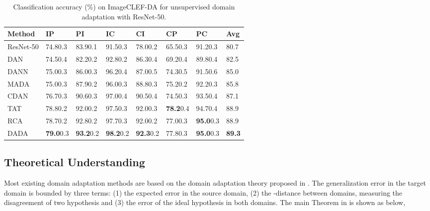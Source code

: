 \documentclass{ecai}
\begin{document}
\begin{table*}[!htbp]
\centering
\caption{Classification accuracy (\%) on ImageCLEF-DA for unsupervised domain adaptation with ResNet-50.}
\begin{tabular}{p{3.0cm}p{1.4cm}<{\centering}p{1.4cm}<{\centering}p{1.4cm}<{\centering}p{1.4cm}<{\centering}p{1.4cm}<{\centering}p{1.4cm}<{\centering}p{1.4cm}<{\centering}}
\toprule
Method&   IP&   PI&   IC&   CI&   CP&   PC&  Avg\\
\midrule
ResNet-50\cite{b36}&  74.80.3&   83.90.1&   91.50.3&   78.00.2&   65.50.3&   91.20.3&   80.7\\
DAN\cite{b9}&  74.50.4&   82.20.2&   92.80.2&   86.30.4&   69.20.4&   89.80.4&   82.5\\
DANN\cite{b18}& 75.00.3&   86.00.3&   96.20.4&   87.00.5&   74.30.5&   91.50.6&   85.0\\
MADA\cite{b13}& 75.00.3&   87.90.2&   96.00.3&   88.80.3&   75.20.2&   92.20.3&   85.8\\
CDAN\cite{b34}& 76.70.3&   90.60.3&   97.00.4&   90.50.4&   74.50.3&   93.50.4&   87.1\\
TAT\cite{b35}&  78.80.2&   92.00.2&   97.50.3&   92.00.3&   \textbf{78.2}0.4&   94.70.4&   88.9\\
RCA\cite{b17}&  78.70.2&   92.80.2&   97.70.3&   92.00.2&   77.00.3&   \textbf{95.0}0.3&   88.9\\
DADA&      \textbf{79.0}0.3& \textbf{93.2}0.2& \textbf{98.2}0.2&   \textbf{92.3}0.2&   77.80.3&   \textbf{95.0}0.3&   \textbf{89.3}\\
\bottomrule
\end{tabular}
\label{res_2}
\end{table*}

\subsection{Theoretical Understanding}

Most existing domain adaptation methods are based on the domain adaptation theory proposed in \cite{b3}. The generalization error in the target domain  is bounded by three terms: (1) the expected error  in the source domain, (2) the -distance  between domains, measuring the disagreement of two hypothesis  and (3) the error  of the ideal hypothesis  in both domains. The main Theorem in \cite{b3} is shown as below,
\end{document}
